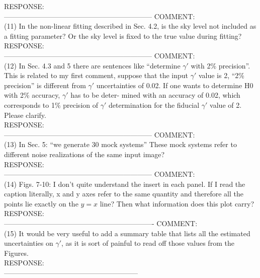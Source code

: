 \documentclass[numberedappendix,12pt,preprint]{emulateapj}
\begin{document}
RESPONSE:
\\

---------------------------------------------------------------
COMMENT:
\\
(11) In the non-linear fitting described in Sec. 4.2, is the sky level not included as a fitting parameter? Or the sky level is fixed to the true value during fitting?
\\

RESPONSE:
\\

---------------------------------------------------------------
COMMENT:
\\
(12) In Sec. 4.3 and 5 there are sentences like “determine $\gamma'$ with 2\% precision”. This is related to my first comment, suppose that the input $\gamma'$ value is 2, “2\% precision” is different from $\gamma'$ uncertainties of 0.02. If one wants to determine H0 with 2\% accuracy, $\gamma'$ has to be deter- mined with an accuracy of 0.02, which corresponds to 1\% precision of $\gamma'$ determination for the fiducial $\gamma'$ value of 2. Please clarify.
\\

RESPONSE:
\\

---------------------------------------------------------------
COMMENT:
\\
(13) In Sec. 5: “we generate 30 mock systems” These mock systems refer to different noise realizations of the same input image?
\\

RESPONSE:
\\

---------------------------------------------------------------
COMMENT:
\\
(14) Figs. 7-10: I don’t quite understand the insert in each panel. If I read the caption literally, x and y axes refer to the same quantity and therefore all the points lie exactly on the $y = x$ line? Then what information does this plot carry?
\\

RESPONSE:
\\

----------------------------------------------------------------
COMMENT:
\\
(15) It would be very useful to add a summary table that lists all the estimated uncertainties on $\gamma'$, as it is sort of painful to read off those values from the Figures.
\\

RESPONSE:
\\

---------------------------------------------------------
\end{document}
